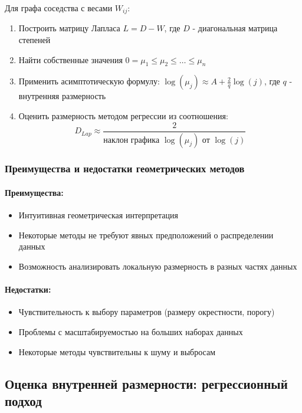 \documentclass[a4paper,12pt]{article}
\begin{document}
Для графа соседства с весами $W_{ij}$:
\begin{enumerate}
    \item Построить матрицу Лапласа $L = D - W$, где $D$ - диагональная матрица степеней
    \item Найти собственные значения $0 = \mu_1 \leq \mu_2 \leq \ldots \leq \mu_n$
    \item Применить асимптотическую формулу: $\log(\mu_j) \approx A + \frac{2}{q}\log(j)$, где $q$ - внутренняя размерность
    \item Оценить размерность методом регрессии из соотношения:
    \begin{equation}
        D_{Lap} \approx \frac{2}{\text{наклон графика } \log(\mu_j) \text{ от } \log(j)}
    \end{equation}
\end{enumerate}

\subsubsection{Преимущества и недостатки геометрических методов}

\paragraph{Преимущества:}
\begin{itemize}
    \item Интуитивная геометрическая интерпретация
    \item Некоторые методы не требуют явных предположений о распределении данных
    \item Возможность анализировать локальную размерность в разных частях данных
\end{itemize}

\paragraph{Недостатки:}
\begin{itemize}
    \item Чувствительность к выбору параметров (размеру окрестности, порогу)
    \item Проблемы с масштабируемостью на больших наборах данных
    \item Некоторые методы чувствительны к шуму и выбросам
\end{itemize}

\subsection{Оценка внутренней размерности: регрессионный подход}
\end{document}
